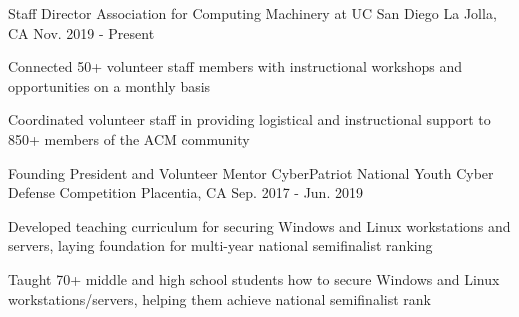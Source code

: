

\begin{cventries}

  \cventry
    {Staff Director} %
    {Association for Computing Machinery at UC San Diego} %
    {La Jolla, CA} %
    {Nov. 2019 - Present} %
    {
      \begin{cvitems} %
        \item {Connected 50+ volunteer staff members with instructional workshops and opportunities on a monthly basis}
        \item {Coordinated volunteer staff in providing logistical and instructional support to 850+ members of the ACM community}
      \end{cvitems}
    }

  \cventry
    {Founding President and Volunteer Mentor} %
    {CyberPatriot National Youth Cyber Defense Competition} %
    {Placentia, CA} %
    {Sep. 2017 - Jun. 2019} %
    {
      \begin{cvitems} %
        \item {Developed teaching curriculum for securing Windows and Linux workstations and servers, laying foundation for multi-year national semifinalist ranking}
        \item {Taught 70+ middle and high school students how to secure Windows and Linux workstations/servers, helping them achieve national semifinalist rank}
      \end{cvitems}
    }

\end{cventries}
